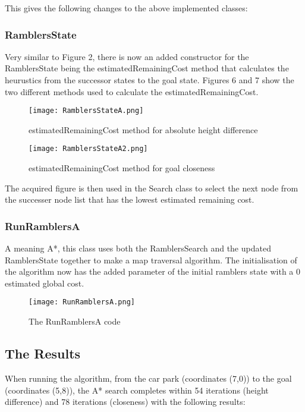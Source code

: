 \documentclass[11pt,oneside]{article}
\begin{document}
This gives the following changes to the above implemented classes:

\subsubsection{RamblersState}

Very similar to Figure 2, there is now an added constructor for the RamblersState being the estimatedRemainingCost method that calculates the heurustics from the successor states to the goal state. Figures 6 and 7 show the two different methods used to calculate the estimatedRemainingCost. 

\begin{figure}[!ht]
\centering
  \texttt{[image: RamblersStateA.png]}
  \caption{estimatedRemainingCost method for absolute height difference}
  \label{fig:RamblersStateA}
\end{figure}

\begin{figure}[!ht]
\centering
  \texttt{[image: RamblersStateA2.png]}
  \caption{estimatedRemainingCost method for goal closeness}
  \label{fig:RamblersStateA2}
\end{figure}

The acquired figure is then used in the Search class to select the next node from the successer node list that has the lowest estimated remaining cost.

\subsubsection{RunRamblersA}

A meaning A*, this class uses both the RamblersSearch and the updated RamblersState together to make a map traversal algorithm. The initialisation of the algorithm now has the added parameter of the initial ramblers state with a 0 estimated global cost.
\begin{figure}[!ht]
\centering
  \texttt{[image: RunRamblersA.png]}
  \caption{The RunRamblersA code}
  \label{fig:RunRamblersA}
\end{figure}

\pagebreak

\subsection{The Results}

When running the algorithm, from the car park (coordinates (7,0)) to the goal (coordinates (5,8)), the A* search completes within 54 iterations (height difference) and 78 iterations (closeness) with the following results:
\end{document}
